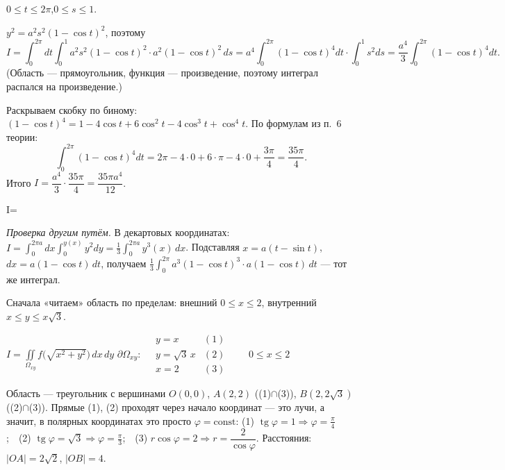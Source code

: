 $0\leqslant t\leqslant2\pi$,\quad $0\leqslant s\leqslant1$.

$y^2=a^2s^2(1-\cos t)^2$, поэтому
\[
I=\int_0^{2\pi}dt\int_0^1 a^2s^2(1-\cos t)^2\cdot a^2(1-\cos t)^2\,ds
=a^4\int_0^{2\pi}(1-\cos t)^4dt\cdot\int_0^1s^2ds=\frac{a^4}{3}\int_0^{2\pi}(1-\cos t)^4dt .
\]
(Область --- прямоугольник, функция --- произведение, поэтому интеграл распался на произведение.)

Раскрываем скобку по биному: $(1-\cos t)^4=1-4\cos t+6\cos^2t-4\cos^3t+\cos^4t$. По формулам из п.~6 теории:
\[
\int_0^{2\pi}(1-\cos t)^4dt=2\pi-4\cdot0+6\cdot\pi-4\cdot0+\frac{3\pi}{4}=\frac{35\pi}{4}.
\]
Итого $I=\dfrac{a^4}{3}\cdot\dfrac{35\pi}{4}=\dfrac{35\pi a^4}{12}$.

\begin{answerbox}
I=
\end{answerbox}

\emph{Проверка другим путём.} В декартовых координатах: $I=\int_0^{2\pi a}dx\int_0^{y(x)}y^2dy=\frac13\int_0^{2\pi a}y^3(x)\,dx$. Подставляя $x=a(t-\sin t)$, $dx=a(1-\cos t)\,dt$, получаем $\frac13\int_0^{2\pi}a^3(1-\cos t)^3\cdot a(1-\cos t)\,dt$ --- тот же интеграл. \checkmark


Сначала «читаем» область по пределам: внешний $0\leqslant x\leqslant2$, внутренний $x\leqslant y\leqslant x\sqrt3$.
\begin{shapka}
$\displaystyle I=\iint\limits_{\Omega_{xy}}f\bigl(\sqrt{x^2+y^2}\bigr)\,dx\,dy$
\tcblower
$\partial\Omega_{xy}:\quad
\begin{array}{ll}
y=x & (1)\\
y=\sqrt3\,x & (2)\\
x=2 & (3)
\end{array}\qquad 0\leqslant x\leqslant 2$
\end{shapka}

Область --- треугольник с вершинами $O(0,0)$, $A(2,2)$ ((1)$\cap$(3)), $B(2,2\sqrt3)$ ((2)$\cap$(3)). Прямые (1), (2) проходят через начало координат --- это лучи, а значит, в полярных координатах это просто $\varphi=\mathrm{const}$:
(1) $\operatorname{tg}\varphi=1\Rightarrow\varphi=\frac\pi4$;\ \ (2) $\operatorname{tg}\varphi=\sqrt3\Rightarrow\varphi=\frac\pi3$;\ \ (3) $r\cos\varphi=2\Rightarrow r=\dfrac{2}{\cos\varphi}$.
Расстояния: $|OA|=2\sqrt2$, $|OB|=4$.

